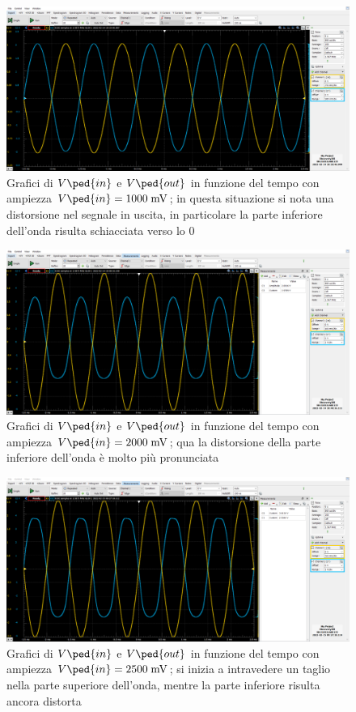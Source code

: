 \documentclass[10pt, a4paper, italian]{article}
\begin{document}
\begin{figure}[htbp]
    \centering
	\includegraphics[scale=0.4]{amp.1000}
    \caption{Grafici di $V\ped{in}$ e $V\ped{out}$ in funzione del tempo con ampiezza $V\ped{in}=1000 \; \si{m\V}$; in questa situazione si nota una distorsione nel segnale in uscita, in particolare la parte inferiore dell'onda risulta schiacciata verso lo 0}
\end{figure}
\begin{figure}[htbp]
    \centering
	\includegraphics[scale=0.4]{amp.2000}
    \caption{Grafici di $V\ped{in}$ e $V\ped{out}$ in funzione del tempo con ampiezza $V\ped{in}=2000 \; \si{m\V}$; qua la distorsione della parte inferiore dell'onda è molto più pronunciata}
\end{figure}
\begin{figure}[htbp]
    \centering
	\includegraphics[scale=0.4]{amp.2500}
    \caption{Grafici di $V\ped{in}$ e $V\ped{out}$ in funzione del tempo con ampiezza $V\ped{in}=2500 \; \si{m\V}$; si inizia a intravedere un taglio nella parte superiore dell'onda, mentre la parte inferiore risulta ancora distorta}
\end{figure}
\end{document}
